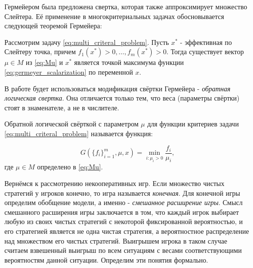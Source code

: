 Гермейером была предложена свертка, которая также аппроксимирует 
множество Слейтера. Её применение в многокритериальных 
задачах обосновывается следующей теоремой Гермейера:

\begin{Theorem}[Гермейер]
	Рассмотрим задачу \eqref{eq:multi_criteral_problem}.     
    Пусть $x^*$ - эффективная по Слейтеру точка, 
    причем $f_1(x^*)>0, \ldots, f_m(x^*)>0$.
    Тогда существует вектор $\mu \in M$ из \eqref{eq:Mu} 
    и $x^*$ является точкой максимума функции 
    \eqref{eq:germeyer_scalarization} по переменной $x$. 
    \cite{germeyer} 
\end{Theorem}

В работе будет использоваться модификация свёртки Гермейера -
\textit{обратная логическая свертка}. Она отличается
только тем, что веса (параметры свёртки) стоят в знаменателе, 
а не в числителе.

\begin{Defenition}
	Обратной логической свёрткой с параметром $\mu$ для 
	функции критериев задачи \eqref{eq:multi_criteral_problem}
	называется функция:
	
	\begin{equation}
		G(\{f_i\}_{i=1}^{m}, \mu, x)=
		\min \limits_{i: \mu_i > 0} \frac{f_i}{\mu_i},
		\label{eq:RL_scalarization}	
	\end{equation}
	где $\mu \in M$ определено в \eqref{eq:Mu}.
\end{Defenition}

Вернёмся к рассмотрению некооперативных игр.
Если множество чистых стратегий у игроков конечно, то игра
называется \textit{конечная}. Для конечной игры
определим обобщение модели, 
а именно - \textit{смешанное расширение игры}.
Смысл смешанного расширения игры заключается в том, что
каждый игрок выбирает любую из своих чистых стратегий с некоторой
фиксированной вероятностью, и его стратегией является
не одна чистая стратегия, а вероятностное  распределение над множеством 
его чистых стратегий. Выигрышем игрока в таком случае считаем взвешенный
выигрыш по всем ситуациям с весами соответствующими вероятностям данной
ситуации. Определим эти понятия формально.

